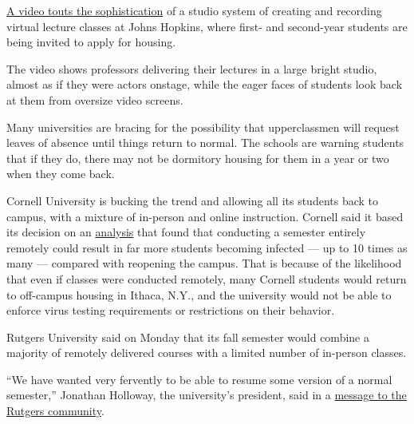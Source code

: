 \href{https://vimeo.com/johnshopkins/review/433786130/1ed867a018}{A
video touts the sophistication} of a studio system of creating and
recording virtual lecture classes at Johns Hopkins, where first- and
second-year students are being invited to apply for housing.

The video shows professors delivering their lectures in a large bright
studio, almost as if they were actors onstage, while the eager faces of
students look back at them from oversize video screens.

Many universities are bracing for the possibility that upperclassmen
will request leaves of absence until things return to normal. The
schools are warning students that if they do, there may not be dormitory
housing for them in a year or two when they come back.

Cornell University is bucking the trend and allowing all its students
back to campus, with a mixture of in-person and online instruction.
Cornell said it based its decision on an
\href{https://people.orie.cornell.edu/pfrazier/COVID_19_Modeling_Jun15.pdf}{analysis}
that found that conducting a semester entirely remotely could result in
far more students becoming infected --- up to 10 times as many ---
compared with reopening the campus. That is because of the likelihood
that even if classes were conducted remotely, many Cornell students
would return to off-campus housing in Ithaca, N.Y., and the university
would not be able to enforce virus testing requirements or restrictions
on their behavior.

Rutgers University said on Monday that its fall semester would combine a
majority of remotely delivered courses with a limited number of
in-person classes.

``We have wanted very fervently to be able to resume some version of a
normal semester,'' Jonathan Holloway, the university's president, said
in a
\href{http://link.mediaoutreach.meltwater.com/ls/click?upn=B7qRmy9MCgTfwcglnVfMK-2BAqVl42XzZJ6qWfrpNErMSbHn5Lc2TGqnqiYYEklxHMPmyRbN2vlvYM-2Ba4MJ05tkw-3D-3DByuE_hL7TmydlaMnATh3nUjJggvIFksBL8YdYIW6OdNBg50LtPVULmxBnuqXyyhYlYbSAfyXTCD3A7tmCA0yK8Sc2xQ1ELtNEQ-2FAeZKeeT-2FIVbyaVOW2-2FrzGsXCh8jBDZ4nJlbA7akhdGAu92-2F6x3g2iYXSIFoo-2Bf-2BYpfP399Su8omi3TYwAf3DUtypSNMAVPURTwCu2WEK3ej70cx-2F3euc8hcssOKCmXa2e1K5hFMsU3DXneL8DhASpYjb7lMr53rteDHYpfkK5SoFsB93XaAS0K7ecGaEu6fLUheBJNFjcuGT62Cw7jtQFdC-2FMPC0xoeqCgla-2F0-2BNDm2k-2Fk1E-2B2bzDFjwJ5hXPBPI9weC4Dsihb33qx6xXPOX55uldfzM7GbX0ymSuBOG6DXLCRPiqN-2BD7uxg-3D-3D}{message
to the Rutgers community}.

